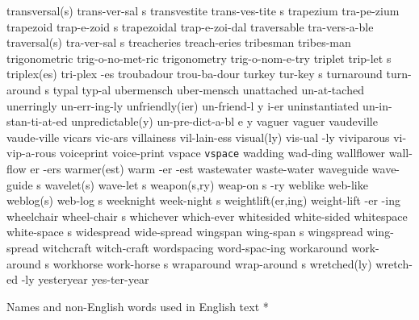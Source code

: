 \2 transversal(s)	trans-ver-sal s
\5 transvestite		trans-ves-tite s
\NewWordtrue
\1 trapezium		tra-pe-zium		%
\NewWordtrue
\5 trapezoid		trap-e-zoid s		%
\NewWordtrue
\1 trapezoidal		trap-e-zoi-dal		%
\1 traversable		tra-vers-a-ble
\2 traversal(s)		tra-ver-sal s
\1 treacheries		treach-eries
\1 tribesman		tribes-man		%
\NewWordtrue
\1 trigonometric	trig-o-no-met-ric	%
\NewWordtrue
\1 trigonometry 	trig-o-nom-e-try	%
\5 triplet		trip-let s		%
\2 triplex(es)		tri-plex -es		%
\1 troubadour		trou-ba-dour
\5 turkey		tur-key s
\5 turnaround		turn-around s
\1 typal		typ-al
\NewWordtrue
\1 ubermensch		uber-mensch		%
\1 unattached		un-at-tached
\1 unerringly		un-err-ing-ly
\3 unfriendly(ier)	un-friend-l y i-er
\1 uninstantiated	un-in-stan-ti-at-ed	%
\NewWordtrue
\3 unpredictable(y)	un-pre-dict-a-bl e y	%
\1 vaguer		vaguer
\1 vaudeville		vaude-ville
\1 vicars		vic-ars
\1 villainess		vil-lain-ess
\2 visual(ly)		vis-ual -ly		%
\1 viviparous		vi-vip-a-rous
\1 voiceprint		voice-print
\1 vspace 		{\tt\bs vspace}
\1 wadding		wad-ding
\6 wallflower		wall-flow er -ers
\3 warmer(est)		warm -er -est		%
\1 wastewater		waste-water
\5 waveguide		wave-guide s
\2 wavelet(s)		wave-let s
\3 weapon(s,ry)		weap-on s -ry		%
\1 weblike		web-like
\2 weblog(s)		web-log s		%
\5 weeknight		week-night s
\3 weightlift(er,ing)	weight-lift -er -ing	%
\5 wheelchair		wheel-chair s
\1 whichever		which-ever
\1 whitesided		white-sided
\5 whitespace		white-space s
\1 widespread		wide-spread
\5 wingspan		wing-span s		%
\1 wingspread		wing-spread
\1 witchcraft		witch-craft
\1 wordspacing		word-spac-ing
\5 workaround		work-around s		%
\5 workhorse		work-horse s
\5 wraparound		wrap-around s		%
\2 wretched(ly)		wretch-ed -ly
\1 yesteryear		yes-ter-year
\endgraf
\endgroup

\head * Names and non-English words \break used in English text *

